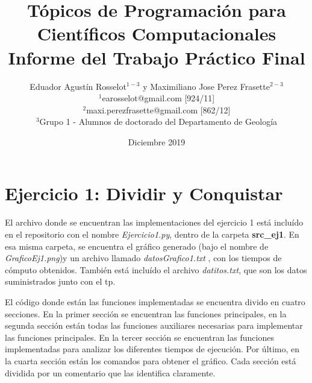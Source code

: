\documentclass[12pt,a4paper,titlepage]{article}
\begin{document}
\title{%
	Tópicos de Programación para Científicos Computacionales\\
	\large Informe del Trabajo Práctico Final}
	
\author {Eduador Agustín Rosselot$^{1-3}$ y Maximiliano Jose Perez Frasette$^{2-3}$\\ 
	\small{$^{1}$earosselot@gmail.com [924/11]}\\
	\small{$^{2}$maxi.perezfrasette@gmail.com [862/12]}\\
	\small{$^{3}$Grupo 1 - Alumnos de doctorado del Departamento de Geología}\\
	}
\date{Diciembre 2019}

\maketitle


\section{Ejercicio 1: Dividir y Conquistar}

El archivo donde se encuentran las implementaciones del ejercicio 1 está incluído en el repositorio con el nombre \textit{Ejercicio1.py}, dentro de la carpeta \textbf{src\_ej1}. En esa misma carpeta, se encuentra el gráfico generado (bajo el nombre de \textit{GraficoEj1.png})y un archivo llamado \textit{datosGrafico1.txt} , con los tiempos de cómputo obtenidos. También está incluído el archivo \textit{datitos.txt}, que son los datos suministrados junto con el tp.\par

El código donde están las funciones implementadas se encuentra divido en cuatro secciones. En la primer sección se encuentran las funciones principales, en la segunda sección están todas las funciones auxiliares necesarias para implementar las funciones principales. En la tercer sección se encuentran las funciones implementadas para analizar los diferentes tiempos de ejecución. Por último, en la cuarta sección están los comandos para obtener el gráfico. Cada sección está dividida por un comentario que las identifica claramente. \par
\end{document}
